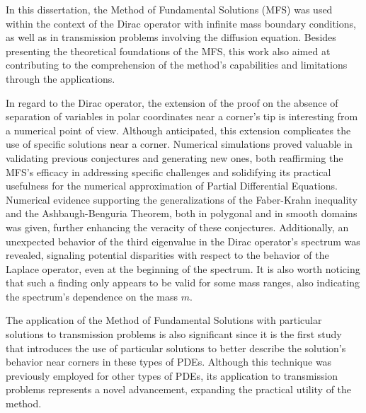 \label{chap:conclusion}

In this dissertation, the Method of Fundamental Solutions (\ac{MFS}) was used within the context of the Dirac operator with infinite mass boundary conditions, as well as in transmission problems involving the diffusion equation. Besides presenting the theoretical foundations of the MFS, this work also aimed at contributing to the comprehension of the method's capabilities and limitations through the applications.

In regard to the Dirac operator, the extension of the proof on the absence of separation of variables in polar coordinates near a corner's tip is interesting from a numerical point of view. Although anticipated, this extension complicates the use of specific solutions near a corner. Numerical simulations proved valuable in validating previous conjectures and generating new ones, both reaffirming the \ac{MFS}'s efficacy in addressing specific challenges and solidifying its practical usefulness for the numerical approximation of Partial Differential Equations. Numerical evidence supporting the generalizations of the Faber-Krahn inequality and the Ashbaugh-Benguria Theorem, both in polygonal and in smooth domains was given, further enhancing the veracity of these conjectures. Additionally, an unexpected behavior of the third eigenvalue in the Dirac operator's spectrum was revealed, signaling potential disparities with respect to the behavior of the Laplace operator, even at the beginning of the spectrum. It is also worth noticing that such a finding only appears to be valid for some mass ranges, also indicating the spectrum's dependence on the mass \(m\).

The application of the Method of Fundamental Solutions with particular solutions to transmission problems is also significant since it is the first study that introduces the use of particular solutions to better describe the solution's behavior near corners in these types of \acp{PDE}. Although this technique was previously employed for other types of \acp{PDE}, its application to transmission problems represents a novel advancement, expanding the practical utility of the method.

